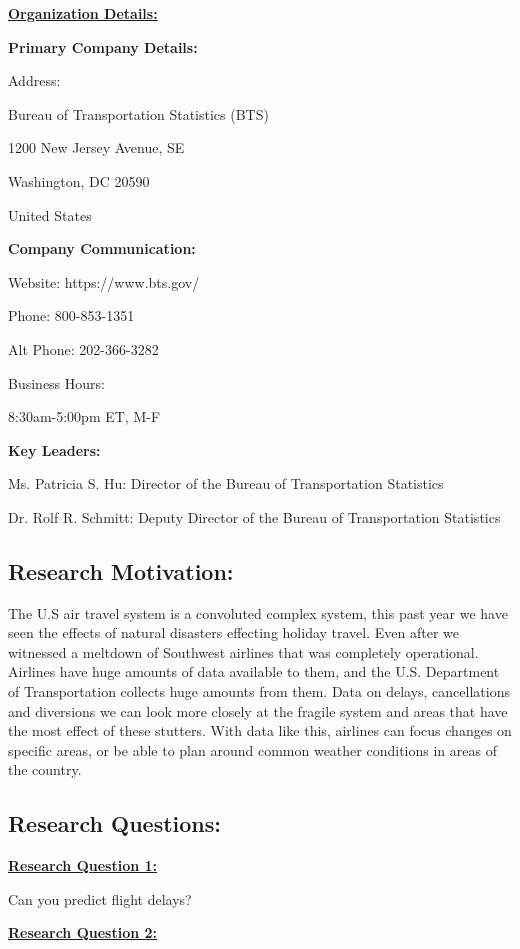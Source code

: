 \documentclass[a4paper,12pt]{article}
\begin{document}
\noindent \textbf{\underline{Organization Details:}}

\textbf{Primary Company Details:}

Address:

Bureau of Transportation Statistics (BTS)

1200 New Jersey Avenue, SE

Washington, DC 20590

United States

\textbf{Company Communication:}

Website: https://www.bts.gov/

Phone: 800-853-1351

Alt Phone: 202-366-3282

Business Hours:

8:30am-5:00pm ET, M-F

\textbf{Key Leaders:}

Ms. Patricia S. Hu: Director of the Bureau of Transportation Statistics

Dr. Rolf R. Schmitt: Deputy Director of the Bureau of Transportation Statistics

\subsection{Research Motivation:}

The U.S air travel system is a convoluted complex system, this past year we have seen the
effects of natural disasters effecting holiday travel. Even after we witnessed a meltdown of
Southwest airlines that was completely operational. Airlines have huge amounts of data
available to them, and the U.S. Department of Transportation collects huge amounts from
them. Data on delays, cancellations and diversions we can look more closely at the fragile
system and areas that have the most effect of these stutters. With data like this, airlines can
focus changes on specific areas, or be able to plan around common weather conditions in areas
of the country.

\subsection{Research Questions:}

\textbf{\underline{Research Question 1:}} \label{rq1}

Can you predict flight delays?

\noindent \textbf{\underline{Research Question 2:}} \label{rq2}
\end{document}
